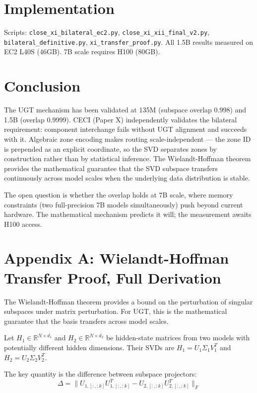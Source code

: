 \documentclass[11pt]{article}
\begin{document}
\section{Implementation}

Scripts: \texttt{close\_xi\_bilateral\_ec2.py}, \texttt{close\_xi\_xii\_final\_v2.py}, \texttt{bilateral\_definitive.py}, \texttt{xi\_transfer\_proof.py}. All 1.5B results measured on EC2 L40S (46GB). 7B scale requires H100 (80GB).

\section{Conclusion}

The UGT mechanism has been validated at 135M (subspace overlap 0.998) and 1.5B (overlap 0.9999). CECI (Paper X) independently validates the bilateral requirement: component interchange fails without UGT alignment and succeeds with it. Algebraic zone encoding makes routing scale-independent --- the zone ID is prepended as an explicit coordinate, so the SVD separates zones by construction rather than by statistical inference. The Wielandt-Hoffman theorem provides the mathematical guarantee that the SVD subspace transfers continuously across model scales when the underlying data distribution is stable.

The open question is whether the overlap holds at 7B scale, where memory constraints (two full-precision 7B models simultaneously) push beyond current hardware. The mathematical mechanism predicts it will; the measurement awaits H100 access.


\section{Appendix A: Wielandt-Hoffman Transfer Proof, Full Derivation}

The Wielandt-Hoffman theorem provides a bound on the perturbation of singular subspaces under matrix perturbation. For UGT, this is the mathematical guarantee that the basis transfers across model scales.

Let $H_1 \in \mathbb{R}^{N \times d_1}$ and $H_2 \in \mathbb{R}^{N \times d_2}$ be hidden-state matrices from two models with potentially different hidden dimensions. Their SVDs are $H_1 = U_1 \Sigma_1 V_1^T$ and $H_2 = U_2 \Sigma_2 V_2^T$.

The key quantity is the difference between subspace projectors:
\begin{equation}
\Delta = \|U_{1,[:,:k]} U_{1,[:,:k]}^T - U_{2,[:,:k]} U_{2,[:,:k]}^T\|_F
\end{equation}
\end{document}
